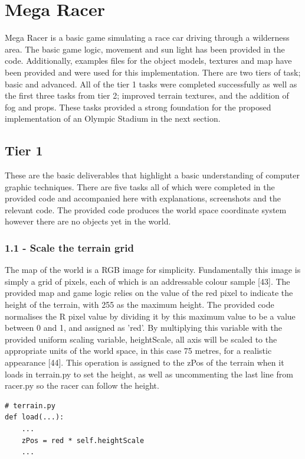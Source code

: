 \documentclass[a4 paper, 12pt]{article}
\begin{document}
\section{Mega Racer}
Mega Racer is a basic game simulating a race car driving through a wilderness area. The basic game logic, movement and sun light has been provided in the code. Additionally, examples files for the object models, textures and map have been provided and were used for this implementation. There are two tiers of task; basic and advanced. All of the tier 1 tasks were completed successfully as well as the first three tasks from tier 2; improved terrain textures, and the addition of fog and props. These tasks provided a strong foundation for the proposed implementation of an Olympic Stadium in the next section. 

\subsection{Tier 1}
These are the basic deliverables that highlight a basic understanding of computer graphic techniques. There are five tasks all of which were completed in the provided code and accompanied here with explanations, screenshots and the relevant code. The provided code produces the world space coordinate system however there are no objects yet in the world.

\subsubsection{1.1 - Scale the terrain grid}
The map of the world is a RGB image for simplicity. Fundamentally this image is simply a grid of pixels, each of which is an addressable colour sample [43]. The provided map and game logic relies on the value of the red pixel to indicate the height of the terrain, with 255 as the maximum height. The provided code normalises the R pixel value by dividing it by this maximum value to be a value between 0 and 1, and assigned as 'red'. By multiplying this variable with the provided uniform scaling variable, heightScale, all axis will be scaled to the appropriate units of the world space, in this case 75 metres, for a realistic appearance [44]. This operation is assigned to the zPos of the terrain when it loads in terrain.py to set the height, as well as uncommenting the last line from racer.py so the racer can follow the height.   
    \begin{lstlisting}
# terrain.py
def load(...):
    ...
    zPos = red * self.heightScale
    ...
    \end{lstlisting}
\end{document}
